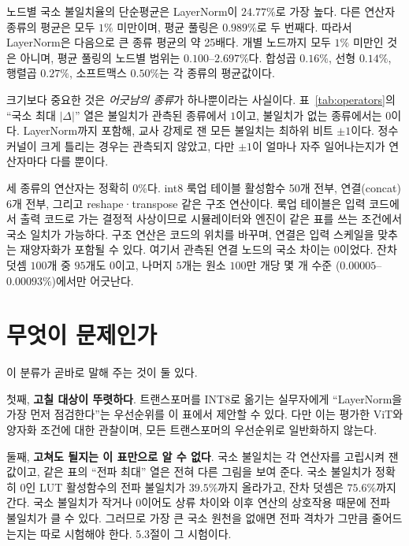 \documentclass[11pt,a4paper,oneside]{report}
\begin{document}
노드별 국소 불일치율의 단순평균은 LayerNorm이 $24.77\%$로 가장 높다. 다른 연산자
종류의 평균은 모두 $1\%$ 미만이며, 평균 풀링은 $0.989\%$로 두 번째다. 따라서 LayerNorm은
다음으로 큰 종류 평균의 약 25배다. 개별 노드까지 모두 $1\%$ 미만인 것은 아니며, 평균 풀링의
노드별 범위는 $0.100$--$2.697\%$다. 합성곱 $0.16\%$, 선형 $0.14\%$, 행렬곱 $0.27\%$,
소프트맥스 $0.50\%$는 각 종류의 평균값이다.

크기보다 중요한 것은 \emph{어긋남의 종류}가 하나뿐이라는 사실이다. 표~\ref{tab:operators}의 ``국소 최대
$|\Delta|$'' 열은 불일치가 관측된 종류에서 $1$이고, 불일치가 없는 종류에서는 $0$이다. LayerNorm까지 포함해, 교사 강제로 잰 모든 불일치는 최하위 비트
$\pm 1$이다. 정수 커널이 크게 틀리는 경우는 관측되지 않았고, 다만 $\pm 1$이 얼마나 자주 일어나는지가
연산자마다 다를 뿐이다.

세 종류의 연산자는 정확히 $0\%$다. int8 룩업 테이블 활성함수 50개 전부, 연결(concat) 6개 전부, 그리고
reshape·transpose 같은 구조 연산이다. 룩업 테이블은 입력 코드에서 출력 코드로 가는 결정적 사상이므로
시뮬레이터와 엔진이 같은 표를 쓰는 조건에서 국소 일치가 가능하다. 구조 연산은 코드의 위치를 바꾸며,
연결은 입력 스케일을 맞추는 재양자화가 포함될 수 있다. 여기서 관측된 연결 노드의 국소 차이는 0이었다. 잔차 덧셈 $100$개 중 $95$개도 $0$이고, 나머지 $5$개는 원소 $100$만 개당 몇 개 수준
($0.00005$--$0.00093\%$)에서만 어긋난다.

\section{무엇이 문제인가}

이 분류가 곧바로 말해 주는 것이 둘 있다.

첫째, \textbf{고칠 대상이 뚜렷하다}. 트랜스포머를 INT8로 옮기는 실무자에게 ``LayerNorm을 가장 먼저
점검한다''는 우선순위를 이 표에서 제안할 수 있다. 다만 이는 평가한 ViT와 양자화 조건에 대한
관찰이며, 모든 트랜스포머의 우선순위로 일반화하지 않는다.

둘째, \textbf{고쳐도 될지는 이 표만으로 알 수 없다}. 국소 불일치는 각 연산자를 고립시켜 잰 값이고,
같은 표의 ``전파 최대'' 열은 전혀 다른 그림을 보여 준다. 국소 불일치가 정확히 $0$인 LUT 활성함수의 전파
불일치가 $39.5\%$까지 올라가고, 잔차 덧셈은 $75.6\%$까지 간다. 국소 불일치가 작거나 0이어도
상류 차이와 이후 연산의 상호작용 때문에 전파 불일치가 클 수 있다. 그러므로 가장 큰 국소 원천을 없애면 전파 격차가 그만큼 줄어드는지는
따로 시험해야 한다. 5.3절이 그 시험이다.

\end{document}
